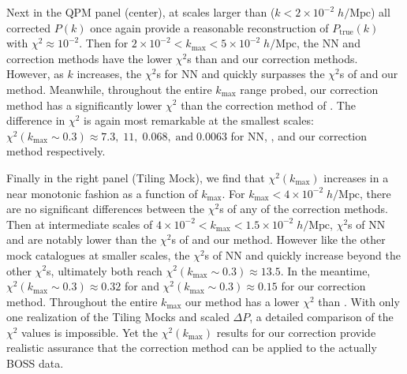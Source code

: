 \documentclass{emulateapj}
\begin{document}
Next in the QPM panel (center), at scales larger than ($k < 2 \times 10^{-2} \; h/\mathrm{Mpc}$) all corrected $P(k)$ once again provide a reasonable reconstruction of $P_\mathrm{true}(k)$ with $\chi^2 \approx 10^{-2}$. Then for $2 \times 10^{-2} < k_\mathrm{max} < 5 \times 10^{-2}\; h/\mathrm{Mpc}$, the NN and \cite{Beutler:2014aa} correction methods have the lower $\chi^2$s than \cite{Gil-Marin:2014aa} and our correction methods. However, as $k$ increases, the $\chi^2$s for NN and \cite{Beutler:2014aa} quickly surpasses the $\chi^2$s of \cite{Gil-Marin:2014aa} and our method. Meanwhile, throughout the entire $k_\mathrm{max}$ range probed, our correction method has a significantly lower $\chi^2$ than the correction method of \cite{Gil-Marin:2014aa}. The difference in $\chi^2$ is again most remarkable at the smallest scales: $\chi^2 (k_\mathrm{max} \sim 0.3) \approx 7.3,\;11, \;0.068, \;\mathrm{and} \; 0.0063$ for NN, \cite{Beutler:2014aa}, \cite{Gil-Marin:2014aa} and our correction method respectively. 

Finally in the right panel (Tiling Mock), we find that $\chi^2(k_\mathrm{max})$ increases in a near monotonic fashion as a function of $k_\mathrm{max}$. For $k_\mathrm{max} < 4\times10^{-2} \; h/\mathrm{Mpc}$, there are no significant differences between the $\chi^2$s of any of the correction methods. Then at intermediate scales of $4\times10^{-2} < k_\mathrm{max} < 1.5\times 10^{-2} \; h/\mathrm{Mpc}$, $\chi^2$s of NN and \cite{Beutler:2014aa} are notably lower than the $\chi^2$s of \cite{Gil-Marin:2014aa} and our method. However like the other mock catalogues at smaller scales, the $\chi^2$s of NN and \cite{Beutler:2014aa} quickly increase beyond the other $\chi^2$s, ultimately both reach $\chi^2(k_\mathrm{max} \sim 0.3) \approx 13.5$. In the meantime, $\chi^2(k_\mathrm{max} \sim 0.3) \approx 0.32$ for \cite{Gil-Marin:2014aa} and $\chi^2(k_\mathrm{max} \sim 0.3) \approx 0.15$ for our correction method. Throughout the entire $k_\mathrm{max}$ our method has a lower $\chi^2$ than \cite{Gil-Marin:2014aa}. With only one realization of the Tiling Mocks and scaled $\Delta P$, a detailed comparison of the $\chi^2$ values is impossible. Yet the $\chi^2(k_\mathrm{max})$ results for our correction provide realistic assurance that the correction method can be applied to the actually BOSS data.
\end{document}
